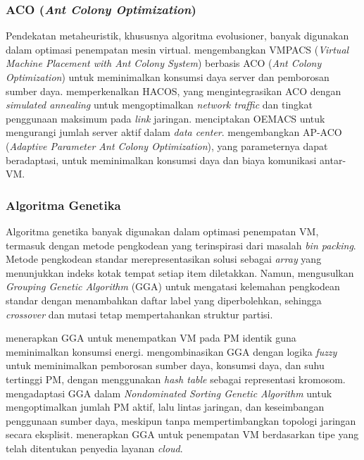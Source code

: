 \subsubsection{ACO (\textit{Ant Colony Optimization})}
Pendekatan metaheuristik, khususnya algoritma evolusioner, banyak digunakan dalam optimasi penempatan mesin virtual. \citet{Gao2013} mengembangkan VMPACS (\textit{Virtual Machine Placement with Ant Colony System}) berbasis ACO (\textit{Ant Colony Optimization}) untuk meminimalkan konsumsi daya server dan pemborosan sumber daya. \citet{AlharabeRakroukiAljohani2022} memperkenalkan HACOS, yang mengintegrasikan ACO dengan \textit{simulated annealing} untuk mengoptimalkan \textit{network traffic} dan tingkat penggunaan maksimum pada \textit{link} jaringan. \citet{Liu2018} menciptakan OEMACS untuk mengurangi jumlah server aktif dalam \textit{data center}. \citet{Wei2019} mengembangkan AP-ACO (\textit{Adaptive Parameter Ant Colony Optimization}), yang parameternya dapat beradaptasi, untuk meminimalkan konsumsi daya dan biaya komunikasi antar-VM.


\subsubsection{Algoritma Genetika}
Algoritma genetika banyak digunakan dalam optimasi penempatan VM, termasuk dengan metode pengkodean yang terinspirasi dari masalah \textit{bin packing}. Metode pengkodean standar merepresentasikan solusi sebagai \textit{array} yang menunjukkan indeks kotak tempat setiap item diletakkan. Namun, \citet{FalkenauerDelchambre1992} mengusulkan \textit{Grouping Genetic Algorithm} (GGA) untuk mengatasi kelemahan pengkodean standar dengan menambahkan daftar label yang diperbolehkan, sehingga \textit{crossover} dan mutasi tetap mempertahankan struktur partisi.

\citet{Wu2021} menerapkan GGA untuk menempatkan VM pada PM identik guna meminimalkan konsumsi energi. \citet{XuFortes2010} mengombinasikan GGA dengan logika \textit{fuzzy} untuk meminimalkan pemborosan sumber daya, konsumsi daya, dan suhu tertinggi PM, dengan menggunakan \textit{hash table} sebagai representasi kromosom. \citet{Liu2014} mengadaptasi GGA dalam \textit{Nondominated Sorting Genetic Algorithm} untuk mengoptimalkan jumlah PM aktif, lalu lintas jaringan, dan keseimbangan penggunaan sumber daya, meskipun tanpa mempertimbangkan topologi jaringan secara eksplisit. \citet{SonklinSonklin2023} menerapkan GGA untuk penempatan VM berdasarkan tipe yang telah ditentukan penyedia layanan \textit{cloud}.

